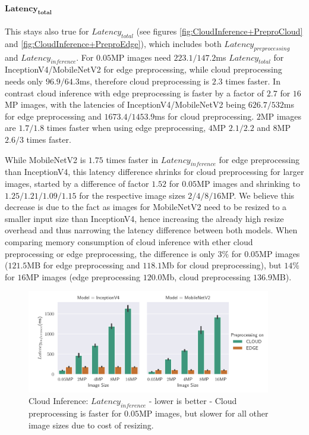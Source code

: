 \paragraph{$\mathbf{Latency_{total}}$}
This stays also true for $Latency_{total}$ (see figures \ref{fig:CloudInference+PreproCloud} and \ref{fig:CloudInference+PreproEdge}), which includes both $Latency_{preprocessing}$ and $Latency_{inference}$. 
For $0.05$MP images need $223.1/147.2$ms $Latency_{total}$ for InceptionV4/MobileNetV2 for edge preprocessing, while cloud preprocessing needs only $96.9/64.3$ms, therefore cloud preprocessing is $2.3$ times faster.
In contrast cloud inference with edge preprocessing is faster by a factor of $2.7$ for $16$MP images, with the latencies of InceptionV4/MobileNetV2 being $626.7/532$ms for edge preprocessing and $1673.4/1453.9$ms for cloud preprocessing. $2$MP images are $1.7/1.8$ times faster when using edge preprocessing, $4$MP $2.1/2.2$ and $8$MP $2.6/3$ times faster.

While MobileNetV2 is $1.75$ times faster in $Latency_{inference}$ for edge preprocessing than InceptionV4, this latency difference shrinks for cloud preprocessing for larger images, started by a difference of factor $1.52$ for $0.05$MP images and shrinking to $1.25/1.21/1.09/1.15$ for the respective image sizes $2/4/8/16$MP.
We believe this decrease is due to the fact as images for MobileNetV2 need to be resized to a smaller input size than InceptionV4, hence increasing the already high resize overhead and thus narrowing the latency difference between both models.
When comparing memory consumption of cloud inference with ether cloud preprocessing or edge preprocessing, the difference is only $3\%$ for  $0.05$MP images ($121.5$MB for edge preprocessing and $118.1$Mb for cloud preprocessing), but $14\%$ for $16$MP images (edge preprocessing $120.0$Mb, cloud preprocessing $136.9$MB).

\begin{figure}[!htb]
\centering
\includegraphics[width=0.95\textwidth]{./Bilder/single_plots/cloud_inference_plots/Cloud_Inference_Latency.pdf}
\caption[Cloud Inference:  $Latency_{inference}$ - lower is better]{Cloud Inference:  $Latency_{inference}$ - lower is better - Cloud preprocessing is faster for $0.05$MP images, but slower for all other image sizes due to cost of resizing.}
\label{fig:cloudInferenceInferenceLatency}
\end{figure}



